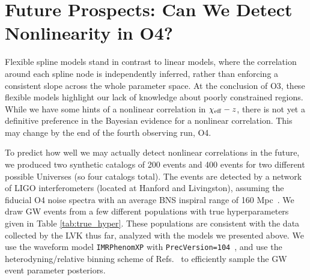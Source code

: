 \documentclass[%
 reprint,
 amsmath,amssymb,
 aps,
 prd,
]{revtex4-2}
\newcommand{\chieff}{\chi_{\rm eff}}
\begin{document}




\section{Future Prospects: Can We Detect Nonlinearity in O4?}
\label{sec:o4_projections}
Flexible spline models stand in contrast to linear models, where the correlation around each spline node is independently inferred, rather than enforcing a consistent slope across the whole parameter space. 
At the conclusion of O3, these flexible models highlight our lack of knowledge about poorly constrained regions. While we have some hints of a nonlinear correlation in $\chieff-z$, there is not yet a definitive preference in the Bayesian evidence for a nonlinear correlation. This may change by the end of the fourth observing run, O4. 

To predict how well we may actually detect nonlinear correlations in the future, we produced two synthetic catalogs of 200 events and 400 events for two different possible Universes (so four catalogs total). The events are detected by a network of LIGO interferometers (located at Hanford and Livingston), assuming the fiducial O4 noise spectra with an average BNS inspiral range of 160 Mpc~\cite{O3_psds}. We draw \ac{GW} events from a few different populations with true hyperparameters given in Table \ref{tab:true_hyper}. These populations are consistent with the data collected by the \ac{LVK} thus far, analyzed with the models we presented above. We use the waveform model \texttt{IMRPhenomXP} with \texttt{PrecVersion=104}~\cite{Pratten:2020ceb}, and use the heterodyning/relative binning scheme of Refs.~\cite{Cornish:2010kf, Cornish:2021lje, Zackay:2018qdy} to efficiently sample the \ac{GW} event parameter posteriors.
\end{document}
